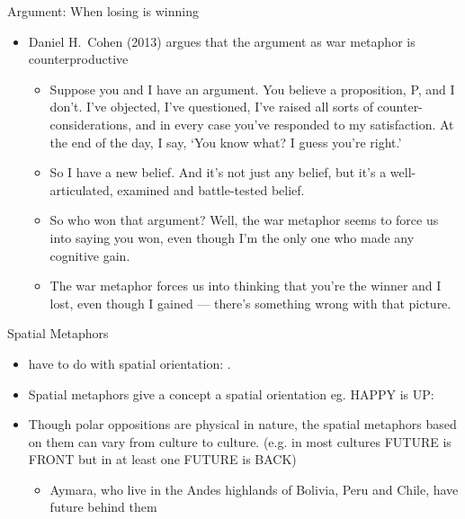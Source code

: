 \begin{frame}{Argument: When losing is winning}

\begin{itemize}
\item Daniel H.\ Cohen (2013) argues that the argument as war metaphor is counterproductive
  \begin{itemize}
  \item Suppose you and I have an argument. You believe a proposition, P, and I don't. I've objected, I've questioned, I've raised all sorts of counter-considerations, and in every case you've responded to my satisfaction. At the end of the day, I say, ‘You know what? I guess you're right.'
  \item So I have a new belief. And it's not just any belief, but it's a well-articulated, examined and battle-tested belief.
  \item So who won that argument? Well, the war metaphor seems to force us into saying you won, even though I'm the only one who made any cognitive gain.
  \item The war metaphor forces us into thinking that you're the winner and I lost, even though I gained ---  there's something wrong with that picture.
  \end{itemize}
  
\end{itemize}



\end{frame}

\begin{frame}{Spatial Metaphors}
\begin{itemize}
\item {} have to do with
spatial orientation: .

\item Spatial metaphors give a concept a spatial orientation eg.
HAPPY is UP: 
\item Though polar oppositions  are physical in nature, the spatial
metaphors based on them can vary from culture to culture. (e.g. in most 
cultures FUTURE is FRONT but in at least one FUTURE is BACK)
\begin{itemize}
\item Aymara, who live in the Andes highlands of Bolivia, Peru and
  Chile, have future behind them
\end{itemize}
\end{itemize}

\end{frame}

